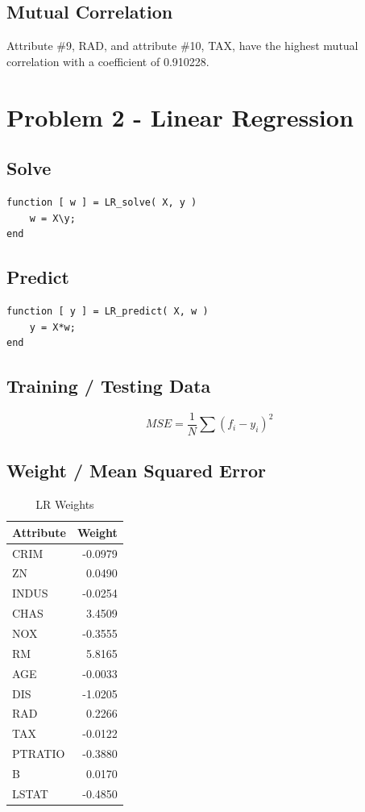 \documentclass[12pt, letterpaper]{report}
\begin{document}
\subsection{Mutual Correlation}

Attribute \#9, RAD, and attribute \#10, TAX, have the highest mutual correlation with a coefficient of 0.910228.

\section{Problem 2 - Linear Regression}

\subsection{Solve}

\begin{verbatim}
function [ w ] = LR_solve( X, y )
    w = X\y;
end
\end{verbatim}

\subsection{Predict}

\begin{verbatim}
function [ y ] = LR_predict( X, w )
    y = X*w;
end
\end{verbatim}

\subsection{Training / Testing Data}

\[ MSE = \frac{1}{N} \sum (f_i -y_i)^2 \]

\subsection{Weight / Mean Squared Error}

\begin{table}[H]
	\centering
	\begin{tabular}{ |l|r| }
		\hline
		Attribute & Weight \\
		\hline
		CRIM & -0.0979 \\
		\hline
		ZN & 0.0490 \\
		\hline
		INDUS & -0.0254 \\
		\hline
		CHAS & 3.4509 \\
		\hline
		NOX & -0.3555 \\
		\hline
		RM & 5.8165 \\
		\hline
		AGE & -0.0033 \\
		\hline
		DIS & -1.0205 \\
		\hline
		RAD & 0.2266 \\
		\hline
		TAX & -0.0122 \\
		\hline
		PTRATIO & -0.3880 \\
		\hline
		B & 0.0170 \\
		\hline
		LSTAT & -0.4850 \\
		\hline
	\end{tabular}
	\caption{LR Weights}
\end{table}
\end{document}
